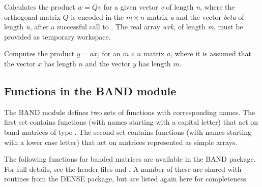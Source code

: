 \documentclass[letterpaper,10pt,english]{sphinxmanual}
\begin{document}

\begin{fulllineitems}
\label{linear_solvers/DLS:denseORMQR}
Calculates the product $w = Qv$ for a given vector \emph{v} of
length \emph{n}, where the orthogonal matrix $Q$ is encoded in the
$m \times n$ matrix \emph{a} and the vector \emph{beta} of length \emph{n},
after a successful call to {\hyperref[linear_solvers/DLS:denseGEQRF]{}}. The real array
\emph{wrk}, of length \emph{m}, must be provided as temporary workspace.

\end{fulllineitems}


\begin{fulllineitems}
\label{linear_solvers/DLS:denseMatvec}
Computes the product $y = ax$, for an $m\times n$
matrix $a$, where it is assumed that the vector $x$ has
length $n$ and the vector $y$ has length $m$.

\end{fulllineitems}



\subsection{Functions in the BAND module}
\label{linear_solvers/DLS:functions-in-the-band-module}
The BAND module defines two sets of functions with corresponding
names. The first set contains functions (with names starting with a
capital letter) that act on band matrices of type {\hyperref[linear_solvers/DLS:DlsMat]{}}. The
second set contains functions (with names starting with a lower case
letter) that act on matrices represented as simple arrays.

The following functions for {\hyperref[linear_solvers/DLS:DlsMat]{}} banded matrices are
available in the BAND package. For full details, see the header files
 and .  A number of these are
shared with routines from the DENSE package, but are listed again here
for completeness.
\end{document}
